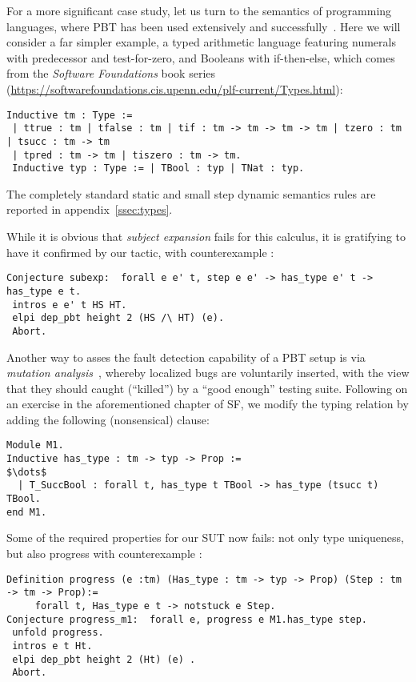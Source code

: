 
For a more significant case study, let us turn to the semantics of
programming languages, where PBT has been used extensively and
successfully~\cite{Klein12}. Here we will consider a far simpler example,
a typed arithmetic language featuring numerals with predecessor  and test-for-zero, 
and Booleans with if-then-else, which comes from the \emph{Software Foundations} book series (\url{https://softwarefoundations.cis.upenn.edu/plf-current/Types.html}):
\begin{lstlisting}
Inductive tm : Type :=
 | ttrue : tm | tfalse : tm | tif : tm -> tm -> tm -> tm | tzero : tm | tsucc : tm -> tm
 | tpred : tm -> tm | tiszero : tm -> tm.
 Inductive typ : Type := | TBool : typ | TNat : typ.
\end{lstlisting}
The completely standard static and small step dynamic semantics rules are
reported in appendix~\ref{ssec:types}.

While it is obvious that \emph{subject expansion} fails for this calculus, it is gratifying to have it confirmed by our tactic, with counterexample :
\begin{lstlisting}
Conjecture subexp:  forall e e' t, step e e' -> has_type e' t -> has_type e t. 
 intros e e' t HS HT.
 elpi dep_pbt height 2 (HS /\ HT) (e).
 Abort.
\end{lstlisting}


Another way to asses the fault detection capability of a PBT setup is via \emph{mutation analysis}~\cite{CavadaCM20}, whereby localized bugs are voluntarily inserted, with the view that they should caught (``killed'') by a ``good enough'' testing suite. Following on  an exercise in the aforementioned chapter of SF, we modify the typing relation by adding the following (nonsensical)  clause:

\begin{lstlisting}
Module M1.
Inductive has_type : tm -> typ -> Prop :=
$\dots$
  | T_SuccBool : forall t, has_type t TBool -> has_type (tsucc t) TBool.
end M1.
\end{lstlisting}
Some of the required properties for our SUT now fails: not
only type uniqueness, but also progress with counterexample :
\begin{lstlisting}
Definition progress (e :tm) (Has_type : tm -> typ -> Prop) (Step : tm -> tm -> Prop):= 
     forall t, Has_type e t -> notstuck e Step.
Conjecture progress_m1:  forall e, progress e M1.has_type step.
 unfold progress.
 intros e t Ht.    
 elpi dep_pbt height 2 (Ht) (e) .
 Abort.
\end{lstlisting}

